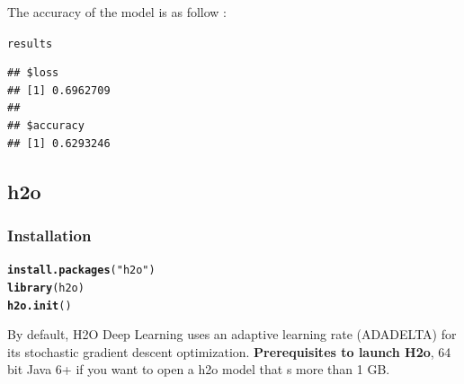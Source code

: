\documentclass[letter,8pt]{article}\usepackage[]{graphicx}\usepackage[]{color}
\makeatletter
\newcommand{\hlstr}[1]{\textcolor[rgb]{0.192,0.494,0.8}{#1}}%
\newcommand{\hlstd}[1]{\textcolor[rgb]{0.345,0.345,0.345}{#1}}%
\newcommand{\hlkwd}[1]{\textcolor[rgb]{0.737,0.353,0.396}{\textbf{#1}}}%
\newenvironment{kframe}{%
 \def\at@end@of@kframe{}%
 \ifinner\ifhmode%
  \def\at@end@of@kframe{\end{minipage}}%
  \begin{minipage}{\columnwidth}%
 \fi\fi%
 \def\FrameCommand##1{\hskip\@totalleftmargin \hskip-\fboxsep
 \colorbox{shadecolor}{##1}\hskip-\fboxsep
     \hskip-\linewidth \hskip-\@totalleftmargin \hskip\columnwidth}%
 \MakeFramed {\advance\hsize-\width
   \@totalleftmargin\z@ \linewidth\hsize
   \@setminipage}}%
 {\par\unskip\endMakeFramed%
 \at@end@of@kframe}
\newenvironment{knitrout}{}{} %
\makeatother
\begin{document}
The accuracy of the model is as follow :
\begin{knitrout}
\color{fgcolor}\begin{kframe}
\begin{alltt}
\hlstd{results}
\end{alltt}
\begin{verbatim}
## $loss
## [1] 0.6962709
## 
## $accuracy
## [1] 0.6293246
\end{verbatim}
\end{kframe}
\end{knitrout}
\subsection{h2o}
\subsubsection{Installation}
\begin{knitrout}
\color{fgcolor}\begin{kframe}
\begin{alltt}
\hlkwd{install.packages}\hlstd{(}\hlstr{"h2o"}\hlstd{)}
\hlkwd{library}\hlstd{(h2o)}
\hlkwd{h2o.init}\hlstd{()}
\end{alltt}
\end{kframe}
\end{knitrout}
By default, H2O Deep Learning uses an adaptive learning rate (ADADELTA) for its stochastic gradient descent optimization.
\textbf{Prerequisites to launch H2o}, 64 bit Java 6+ if you want to open a h2o model that s more than 1 GB. 
\end{document}
